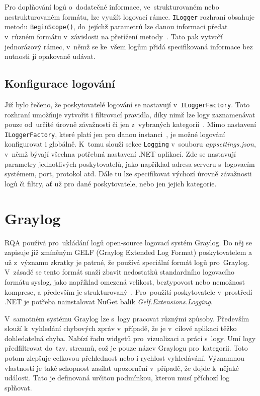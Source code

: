 Pro doplňování logů o~dodatečné informace, ve~strukturovaném nebo nestrukturovaném formátu, lze využít logovací rámce. \texttt{ILogger} rozhraní obsahuje metodu \texttt{BeginScope()}, do~jejíchž parametrů lze danou informaci předat v~různém formátu v~závislosti na přetížení metody~\cite{logging, ilogger-beginscope}. Tato pak vytvoří jednorázový rámec, v~němž se ke~všem logům přidá specifikovaná informace bez nutnosti ji opakovaně udávat.

\subsection{Konfigurace logování}
Již bylo řečeno, že poskytovatelé logování se nastavují v~\texttt{ILoggerFactory}. Toto rozhraní umožňuje vytvořit i filtrovací pravidla, díky nimž lze logy zaznamenávat pouze od~určité úrovně závažnosti či jen z~vybraných kategorií~\cite{logging}. Mimo nastavení \texttt{ILoggerFactory}, které platí jen pro danou instanci~\cite{logging}, je možné logování konfigurovat i globálně. K~tomu slouží sekce \texttt{Logging} v~souboru \emph{appsettings.json}, v~němž bývají všechna potřebná nastavení .NET aplikací. Zde se nastavují parametry jednotlivých poskytovatelů, jako například adresa serveru s~logovacím systémem, port, protokol atd. Dále tu lze specifikovat výchozí úrovně závažnosti logů či filtry, ať už pro dané poskytovatele, nebo jen jejich kategorie.

\section{Graylog}
\label{graylog}
RQA používá pro~ukládání logů open-source logovací systém Graylog. Do něj se zapisuje již zmíněným GELF (Graylog Extended Log Format) poskytovatelem a už z~významu zkratky je patrné, že používá speciální formát logů pro~Graylog. V~zásadě se tento formát snaží zbavit nedostatků standardního logovacího formátu syslog, jako například omezená velikost, beztypovost nebo nemožnost komprese, a především je strukturovaný~\cite{gelf}. Pro~použití poskytovatele v~prostředí .NET je potřeba nainstalovat NuGet balík \emph{Gelf.Extensions.Logging}.

V~samotném systému Graylog lze s~logy pracovat různými způsoby. Především slouží k~vyhledání chybových zpráv v~případě, že je v~cílové aplikaci těžko dohledatelná chyba. Nabízí řadu widgetů pro~vizualizaci a práci s~logy. Umí logy předfiltrovat do~tzv. streamů, což je pouze název Graylogu pro~kategorii. Toto potom zlepšuje celkovou přehlednost nebo i rychlost vyhledávání. Významnou vlastností je také schopnost zasílat upozornění v~případě, že dojde k~nějaké události. Tato je definovaná určitou podmínkou, kterou musí příchozí log splňovat.

